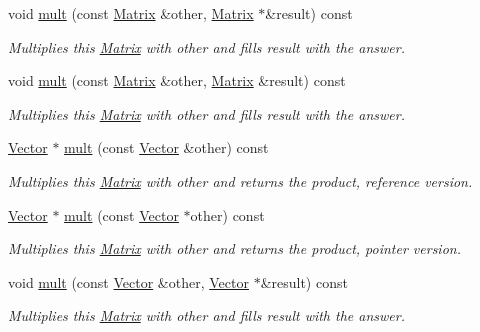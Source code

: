 \begin{DoxyCompactItemize}
void \hyperlink{class_c_a_r_o_m_1_1_matrix_a6f2db8d2f318e733796b3838d7635de1}{mult} (const \hyperlink{class_c_a_r_o_m_1_1_matrix}{Matrix} \&other, \hyperlink{class_c_a_r_o_m_1_1_matrix}{Matrix} $\ast$\&result) const 
\begin{DoxyCompactList}\small\item\em Multiplies this \hyperlink{class_c_a_r_o_m_1_1_matrix}{Matrix} with other and fills result with the answer. \end{DoxyCompactList}\item 
void \hyperlink{class_c_a_r_o_m_1_1_matrix_ab364a0bc6f02142fba687d35bfc7d01b}{mult} (const \hyperlink{class_c_a_r_o_m_1_1_matrix}{Matrix} \&other, \hyperlink{class_c_a_r_o_m_1_1_matrix}{Matrix} \&result) const 
\begin{DoxyCompactList}\small\item\em Multiplies this \hyperlink{class_c_a_r_o_m_1_1_matrix}{Matrix} with other and fills result with the answer. \end{DoxyCompactList}\item 
\hyperlink{class_c_a_r_o_m_1_1_vector}{Vector} $\ast$ \hyperlink{class_c_a_r_o_m_1_1_matrix_ab11e30784d801cd1ef6f972e9c8b88e9}{mult} (const \hyperlink{class_c_a_r_o_m_1_1_vector}{Vector} \&other) const 
\begin{DoxyCompactList}\small\item\em Multiplies this \hyperlink{class_c_a_r_o_m_1_1_matrix}{Matrix} with other and returns the product, reference version. \end{DoxyCompactList}\item 
\hyperlink{class_c_a_r_o_m_1_1_vector}{Vector} $\ast$ \hyperlink{class_c_a_r_o_m_1_1_matrix_a6de8afd0cab59dd0413f84a83bcb0e5c}{mult} (const \hyperlink{class_c_a_r_o_m_1_1_vector}{Vector} $\ast$other) const 
\begin{DoxyCompactList}\small\item\em Multiplies this \hyperlink{class_c_a_r_o_m_1_1_matrix}{Matrix} with other and returns the product, pointer version. \end{DoxyCompactList}\item 
void \hyperlink{class_c_a_r_o_m_1_1_matrix_a29b16fc146fc9fecbae7c01bba737e17}{mult} (const \hyperlink{class_c_a_r_o_m_1_1_vector}{Vector} \&other, \hyperlink{class_c_a_r_o_m_1_1_vector}{Vector} $\ast$\&result) const 
\begin{DoxyCompactList}\small\item\em Multiplies this \hyperlink{class_c_a_r_o_m_1_1_matrix}{Matrix} with other and fills result with the answer. \end{DoxyCompactList}\item 

\end{DoxyCompactItemize}
